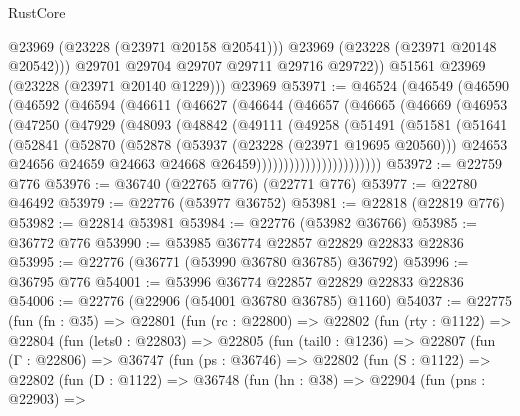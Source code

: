 \begin{lexlean}{RustCore}
\begin{coremodule}
              @23969
              (@23228 (@23971 @20158 @20541)))
            @23969
            (@23228 (@23971 @20148 @20542)))
          @29701
          @29704
          @29707
          @29711
          @29716
          @29722))
      @51561
      @23969
      (@23228 (@23971 @20140 @1229)))
    @23969
@53971 := @46524
    (@46549
      (@46590
        (@46592
          (@46594
            (@46611
              (@46627
                (@46644
                  (@46657
                    (@46665
                      (@46669
                        (@46953
                          (@47250
                            (@47929
                              (@48093
                                (@48842
                                  (@49111
                                    (@49258
                                      (@51491
                                        (@51581
                                          (@51641
                                            (@52841
                                              (@52870
                                                (@52878
                                                  (@53937 (@23228 (@23971 @19695 @20560)))
                                                  @24653
                                                  @24656
                                                  @24659
                                                  @24663
                                                  @24668
                                                  @26459)))))))))))))))))))))))
@53972 := @22759 @776
@53976 := @36740 (@22765 @776) (@22771 @776)
@53977 := @22780 @46492
@53979 := @22776 (@53977 @36752)
@53981 := @22818 (@22819 @776)
@53982 := @22814 @53981
@53984 := @22776 (@53982 @36766)
@53985 := @36772 @776
@53990 := @53985 @36774 @22857 @22829 @22833 @22836
@53995 := @22776 (@36771 (@53990 @36780 @36785) @36792)
@53996 := @36795 @776
@54001 := @53996 @36774 @22857 @22829 @22833 @22836
@54006 := @22776 (@22906 (@54001 @36780 @36785) @1160)
@54037 := @22775
    (fun (fn : @35) =>
    @22801
      (fun (rc : @22800) =>
      @22802
        (fun (rty : @1122) =>
        @22804
          (fun (lets0 : @22803) =>
          @22805
            (fun (tail0 : @1236) =>
            @22807
              (fun (Γ : @22806) =>
              @36747
                (fun (ps : @36746) =>
                @22802
                  (fun (S : @1122) =>
                  @22802
                    (fun (D : @1122) =>
                    @36748
                      (fun (hn : @38) =>
                      @22904
                        (fun (pns : @22903) =>

\end{coremodule}
\end{lexlean}

